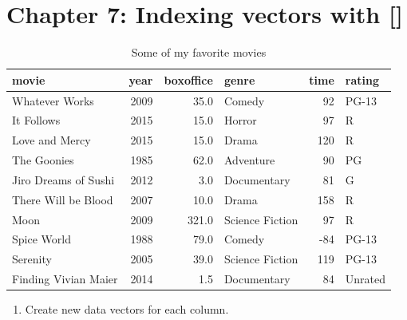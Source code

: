 \documentclass[]{book}
\providecommand{\tightlist}{%
  \setlength{\itemsep}{0pt}\setlength{\parskip}{0pt}}
\theoremstyle{definition}
\theoremstyle{definition}
\theoremstyle{remark}
\begin{document}
\section{Chapter 7: Indexing vectors with
{[}{]}}\label{chapter-7-indexing-vectors-with}

\begin{table}

\caption{\label{tab:unnamed-chunk-516}Some of my favorite movies}
\centering
\begin{tabular}[t]{l|r|r|l|r|l}
\hline
movie & year & boxoffice & genre & time & rating\\
\hline
Whatever Works & 2009 & 35.0 & Comedy & 92 & PG-13\\
\hline
It Follows & 2015 & 15.0 & Horror & 97 & R\\
\hline
Love and Mercy & 2015 & 15.0 & Drama & 120 & R\\
\hline
The Goonies & 1985 & 62.0 & Adventure & 90 & PG\\
\hline
Jiro Dreams of Sushi & 2012 & 3.0 & Documentary & 81 & G\\
\hline
There Will be Blood & 2007 & 10.0 & Drama & 158 & R\\
\hline
Moon & 2009 & 321.0 & Science Fiction & 97 & R\\
\hline
Spice World & 1988 & 79.0 & Comedy & -84 & PG-13\\
\hline
Serenity & 2005 & 39.0 & Science Fiction & 119 & PG-13\\
\hline
Finding Vivian Maier & 2014 & 1.5 & Documentary & 84 & Unrated\\
\hline
\end{tabular}
\end{table}

\begin{enumerate}
\def\labelenumi{\arabic{enumi}.}
\setcounter{enumi}{-1}
\tightlist
\item
  Create new data vectors for each column.
\end{enumerate}
\end{document}
